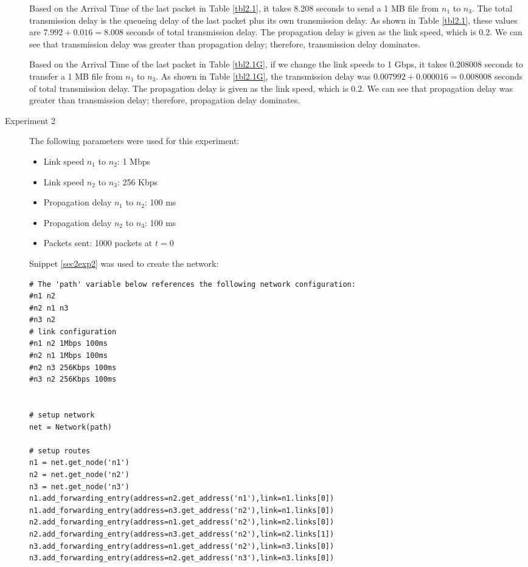 \documentclass[11pt]{article}
\begin{document}
\begin{description}
Based on the Arrival Time of the last packet in Table \ref{tbl2.1}, it takes 8.208 seconds to send a 1 MB file from $n_1$ to $n_3$. The total transmission delay is the queueing delay of the last packet plus its own transmission delay. As shown in Table \ref{tbl2.1}, these values are $7.992 + 0.016 = 8.008$ seconds of total transmission delay. The propagation delay is given as the link speed, which is 0.2. We can see that transmission delay was greater than propagation delay; therefore, transmission delay dominates.

Based on the Arrival Time of the last packet in Table \ref{tbl2.1G}, if we change the link speeds to 1 Gbps, it takes 0.208008 seconds to transfer a 1 MB file from $n_1$ to $n_3$. As shown in Table \ref{tbl2.1G}, the transmission delay was $0.007992 + 0.000016 = 0.008008$ seconds of total transmission delay. The propagation delay is given as the link speed, which is 0.2. We can see that propagation delay was greater than transmission delay; therefore, propagation delay dominates.

\item[Experiment 2] \hfill \break
The following parameters were used for this experiment:

\begin{itemize}
\item Link speed $n_1$ to $n_2$: 1 Mbps
\item Link speed $n_2$ to $n_3$: 256 Kbps
\item Propagation delay $n_1$ to $n_2$: 100 ms
\item Propagation delay $n_2$ to $n_3$: 100 ms
\item Packets sent: 1000 packets at $t = 0$
\end{itemize}

\medskip

Snippet \ref{sec2exp2} was used to create the network:

\medskip

\begin{lstlisting}[caption={Network 2.2},label=sec2exp2]
# The 'path' variable below references the following network configuration:
#n1 n2
#n2 n1 n3
#n3 n2
# link configuration
#n1 n2 1Mbps 100ms
#n2 n1 1Mbps 100ms
#n2 n3 256Kbps 100ms
#n3 n2 256Kbps 100ms


# setup network
net = Network(path)

# setup routes
n1 = net.get_node('n1')
n2 = net.get_node('n2')
n3 = net.get_node('n3')
n1.add_forwarding_entry(address=n2.get_address('n1'),link=n1.links[0])
n1.add_forwarding_entry(address=n3.get_address('n2'),link=n1.links[0])
n2.add_forwarding_entry(address=n1.get_address('n2'),link=n2.links[0])
n2.add_forwarding_entry(address=n3.get_address('n2'),link=n2.links[1])
n3.add_forwarding_entry(address=n1.get_address('n2'),link=n3.links[0])
n3.add_forwarding_entry(address=n2.get_address('n3'),link=n3.links[0])


\end{lstlisting}
\end{description}
\end{document}
